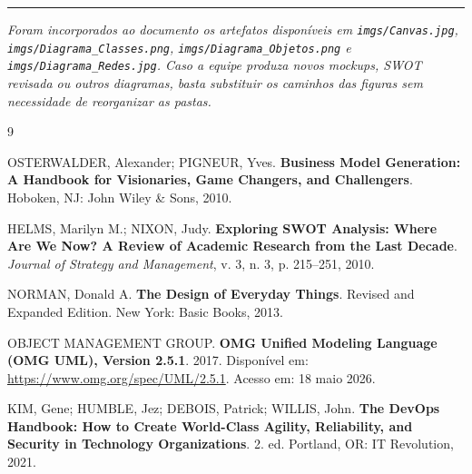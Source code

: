 \documentclass[11pt,a4paper]{article}
\begin{document}
\vspace{1cm}
\noindent\rule{\textwidth}{0.5pt}
\vspace{0.3cm}

\noindent\textit{Foram incorporados ao documento os artefatos disponíveis em \texttt{imgs/Canvas.jpg}, \texttt{imgs/Diagrama\_Classes.png}, \texttt{imgs/Diagrama\_Objetos.png} e \texttt{imgs/Diagrama\_Redes.jpg}. Caso a equipe produza novos mockups, SWOT revisada ou outros diagramas, basta substituir os caminhos das figuras sem necessidade de reorganizar as pastas.}

\newpage
{}
\begin{thebibliography}{9}

OSTERWALDER, Alexander; PIGNEUR, Yves.
\textbf{Business Model Generation: A Handbook for Visionaries, Game Changers, and Challengers}.
Hoboken, NJ: John Wiley \& Sons, 2010.

HELMS, Marilyn M.; NIXON, Judy.
\textbf{Exploring SWOT Analysis: Where Are We Now? A Review of Academic Research from the Last Decade}.
\emph{Journal of Strategy and Management}, v. 3, n. 3, p. 215--251, 2010.

NORMAN, Donald A.
\textbf{The Design of Everyday Things}.
Revised and Expanded Edition. New York: Basic Books, 2013.

OBJECT MANAGEMENT GROUP.
\textbf{OMG Unified Modeling Language (OMG UML), Version 2.5.1}.
2017. Disponível em: \url{https://www.omg.org/spec/UML/2.5.1}. Acesso em: 18 maio 2026.

KIM, Gene; HUMBLE, Jez; DEBOIS, Patrick; WILLIS, John.
\textbf{The DevOps Handbook: How to Create World-Class Agility, Reliability, and Security in Technology Organizations}.
2. ed. Portland, OR: IT Revolution, 2021.

\end{thebibliography}
\end{document}
